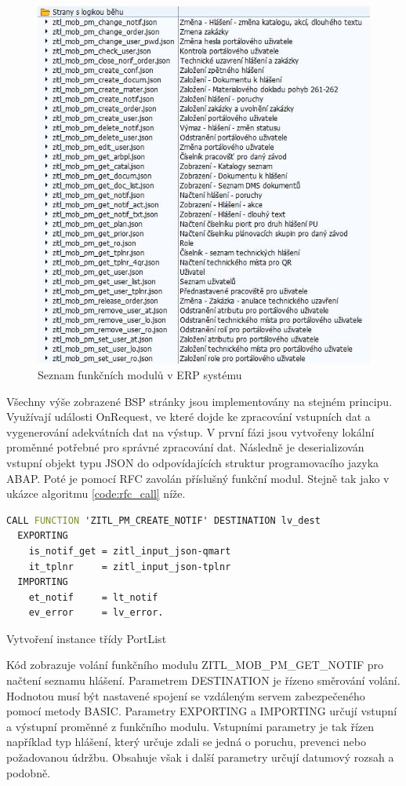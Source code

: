 \documentclass[thesis=M,czech]{FITthesis}[2012/06/26]
\begin{document}
\begin{figure}[H]
	\centering
	\includegraphics[width=1\textwidth]{images/gw_json}
	\caption{Seznam funkčních modulů v ERP systému}
	\label{img:gw_json}
\end{figure}

Všechny výše zobrazené BSP stránky jsou implementovány na stejném principu. Využívají události OnRequest, ve které dojde ke zpracování vstupních dat a vygenerování adekvátních dat na výstup. V první fázi jsou vytvořeny lokální proměnné potřebné pro správné zpracování dat. Následně je deserializován vstupní objekt typu JSON do odpovídajících struktur programovacího jazyka ABAP. Poté je pomocí RFC zavolán příslušný funkční modul. Stejně tak jako v ukázce algoritmu \ref{code:rfc_call} níže. 

\begin{algorithm}[H]	
	\begin{lstlisting}[language = VHDL]  
CALL FUNCTION 'ZITL_PM_CREATE_NOTIF' DESTINATION lv_dest
  EXPORTING
    is_notif_get = zitl_input_json-qmart
    it_tplnr     = zitl_input_json-tplnr
  IMPORTING
    et_notif     = lt_notif
    ev_error     = lv_error.
	\end{lstlisting}
	\caption{Vytvoření instance třídy PortList}	
	\label{code:rfc_call}
	\small Kód zobrazuje volání funkčního modulu ZITL\_MOB\_PM\_GET\_NOTIF pro načtení seznamu hlášení. Parametrem DESTINATION je řízeno směrování volání. Hodnotou musí být nastavené spojení se vzdáleným servem zabezpečeného pomocí metody BASIC. Parametry EXPORTING a IMPORTING určují vstupní a výstupní proměnné z funkčního modulu. Vstupními parametry je tak řízen například typ hlášení, který určuje zdali se jedná o poruchu, prevenci nebo požadovanou údržbu. Obsahuje však i další parametry určují datumový rozsah a podobně.
\end{algorithm}	
\end{document}
